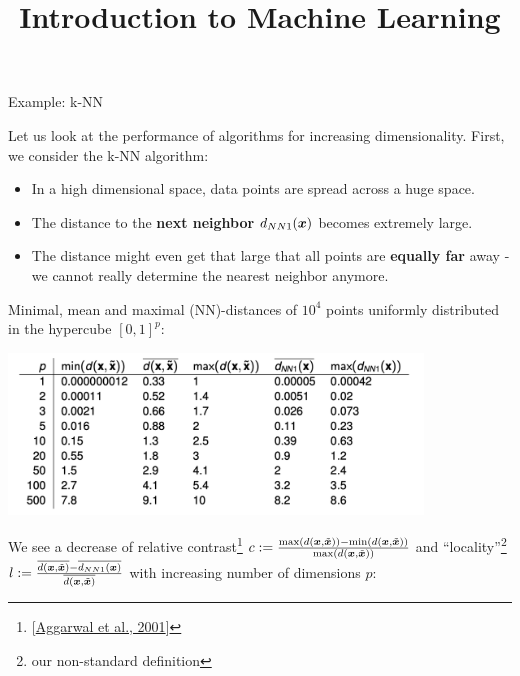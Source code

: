 



\newcommand{\titlefigure}{figure_man/knn_density.png}
\newcommand{\learninggoals}{
  \item \textcolor{blue}{XXX}
  \item \textcolor{blue}{XXX}
}

\title{Introduction to Machine Learning}
\date{}





\begin{vbframe}{Example: k-NN}

Let us look at the performance of algorithms for increasing dimensionality. First, we consider the k-NN algorithm:

\begin{itemize}
\item In a high dimensional space, data points are spread across a huge space.
\item The distance to the \textbf{next neighbor} $d_{NN1}(\bm{x})$ becomes extremely large.
\item The distance might even get that large that all points are \textbf{equally far} away - we cannot really determine the nearest neighbor anymore.
\end{itemize}

\framebreak 

Minimal, mean and maximal (NN)-distances of $10^{4}$ points uniformly distributed in the hypercube $[0,1]^p$:

\begin{center}
\includegraphics[width = 11cm ]{figure_man/knn_table.png}
\end{center}

\framebreak

We see a decrease of relative contrast\footnote{[\href{https://bib.dbvis.de/uploadedFiles/155.pdf}{Aggarwal et al., 2001}]} $c := \frac{\max(d(\bm{x},\tilde{\bm{x}})) - \min(d(\bm{x},\tilde{\bm{x}}))}{\max(d(\bm{x},\tilde{\bm{x}}))}$ and \enquote{locality}\footnote{our non-standard definition} $l := \frac{\overline{d(\bm{x},\tilde{\bm{x}})} -  \overline{d_{NN1}(\bm{x})}}{\overline{d(\bm{x},\tilde{\bm{x}})}}$ with increasing number of dimensions $p$:



\end{vbframe}
